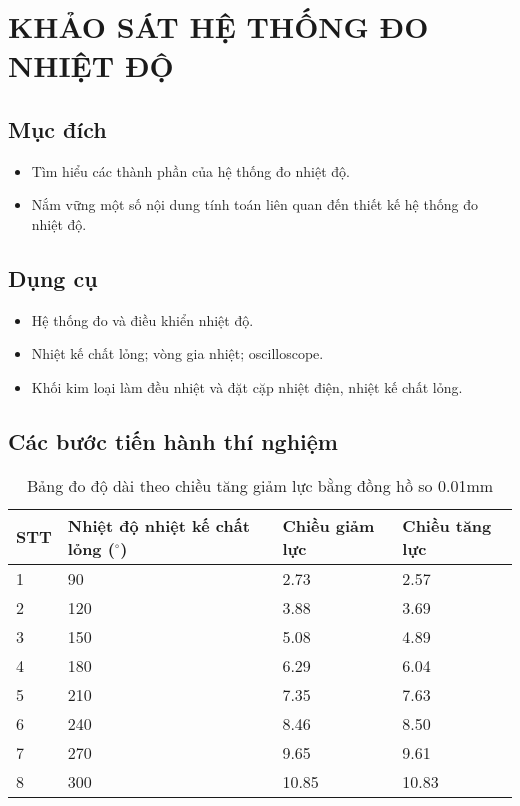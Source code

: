 \chapter{KHẢO SÁT HỆ THỐNG ĐO NHIỆT ĐỘ}

\section{Mục đích}
\begin{itemize}
	\item Tìm hiểu các thành phần của hệ thống đo nhiệt độ.
	\item Nắm vững một số nội dung tính toán liên quan đến thiết kế hệ thống đo nhiệt độ.
\end{itemize}

\section{Dụng cụ}
\begin{itemize}
	\item Hệ thống đo và điều khiển nhiệt độ.
	\item Nhiệt kế chất lỏng; vòng gia nhiệt; oscilloscope.
	\item Khối kim loại làm đều nhiệt và đặt cặp nhiệt điện, nhiệt kế chất lỏng.
\end{itemize}

\section{Các bước tiến hành thí nghiệm}
\begin{table}[ht]
	\centering
	\caption{Bảng đo độ dài theo chiều tăng giảm lực bằng đồng hồ so 0.01mm}
	\begin{tabular}{lp{4cm}ll}\toprule
		STT & Nhiệt độ nhiệt kế chất lỏng ($ ^\circ $) & Chiều giảm lực & Chiều tăng lực\\\midrule
		1 & 90 & 2.73 & 2.57 \\
		2 & 120 & 3.88 & 3.69 \\
		3 & 150 & 5.08 & 4.89 \\
		4 & 180 & 6.29 & 6.04 \\
		5 & 210 & 7.35 & 7.63 \\
		6 & 240 & 8.46 & 8.50 \\
		7 & 270 & 9.65 & 9.61 \\
		8 & 300 & 10.85 & 10.83 \\\bottomrule
	\end{tabular}
\end{table}

